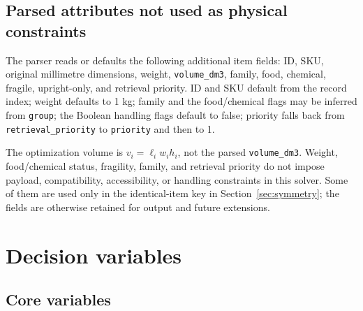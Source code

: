 \documentclass[11pt]{article}
\begin{document}
\subsection{Parsed attributes not used as physical constraints}

The parser reads or defaults the following additional item fields: ID, SKU,
original millimetre dimensions, weight, \texttt{volume\_dm3}, family, food,
chemical, fragile, upright-only, and retrieval priority.  ID and SKU default
from the record index; weight defaults to 1 kg; family and the food/chemical
flags may be inferred from \texttt{group}; the Boolean handling flags default
to false; priority falls back from \texttt{retrieval\_priority} to
\texttt{priority} and then to 1.

The optimization volume is $v_i=\ell_iw_ih_i$, not the parsed
\texttt{volume\_dm3}.  Weight, food/chemical status, fragility, family, and
retrieval priority do not impose payload, compatibility, accessibility, or
handling constraints in this solver.  Some of them are used only in the
identical-item key in Section~\ref{sec:symmetry}; the fields are otherwise
retained for output and future extensions.

\section{Decision variables}

\subsection{Core variables}
\end{document}
